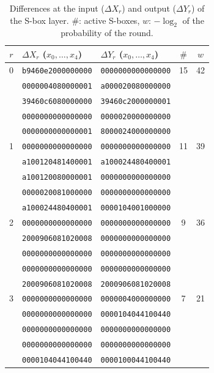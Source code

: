 \documentclass[11pt,a4paper]{article}
\begin{document}
\begin{table}[h]
\centering\small
\caption{Differences at the input ($\Delta X_r$) and output ($\Delta Y_r$) of the S-box layer.
$\#$: active S-boxes, $w$: $-\log_2$ of the probability of the round.}
\label{tab:trail}
\begin{tabular}{c l l c c}
\toprule
$r$ & $\Delta X_r$ ($x_0,\dots,x_4$) & $\Delta Y_r$ ($x_0,\dots,x_4$) & $\#$ & $w$ \\
\midrule
0 & \texttt{b9460e2000000000} & \texttt{0000000000000000} & 15 & 42 \\
  & \texttt{0000004080000001} & \texttt{a000020080000000} & & \\
  & \texttt{39460c6080000000} & \texttt{39460c2000000001} & & \\
  & \texttt{0000000000000000} & \texttt{0000020000000000} & & \\
  & \texttt{0000000000000001} & \texttt{8000024000000000} & & \\
\midrule
1 & \texttt{0000000000000000} & \texttt{0000000000000000} & 11 & 39 \\
  & \texttt{a100120481400001} & \texttt{a100024480400001} & & \\
  & \texttt{a100120080000001} & \texttt{0000000000000000} & & \\
  & \texttt{0000020081000000} & \texttt{0000000000000000} & & \\
  & \texttt{a100024480400001} & \texttt{0000104001000000} & & \\
\midrule
2 & \texttt{0000000000000000} & \texttt{0000000000000000} & 9 & 36 \\
  & \texttt{2000906081020008} & \texttt{0000000000000000} & & \\
  & \texttt{0000000000000000} & \texttt{0000000000000000} & & \\
  & \texttt{0000000000000000} & \texttt{0000000000000000} & & \\
  & \texttt{2000906081020008} & \texttt{2000906081020008} & & \\
\midrule
3 & \texttt{0000000000000000} & \texttt{0000004000000000} & 7 & 21 \\
  & \texttt{0000000000000000} & \texttt{0000104044100440} & & \\
  & \texttt{0000000000000000} & \texttt{0000000000000000} & & \\
  & \texttt{0000000000000000} & \texttt{0000000000000000} & & \\
  & \texttt{0000104044100440} & \texttt{0000100044100440} & & \\

\end{tabular}
\end{table}
\end{document}
